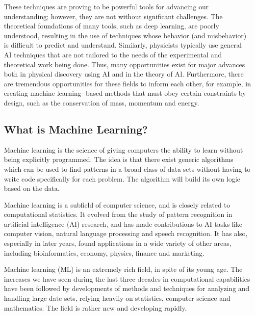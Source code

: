 \documentclass[%
oneside,                 %
final,                   %
10pt]{article}
\begin{document}
These techniques are proving to be powerful tools for advancing our
understanding; however, they are not without significant
challenges. The theoretical foundations of many tools, such as deep
learning, are poorly understood, resulting in the use of techniques
whose behavior (and misbehavior) is difficult to predict and
understand. Similarly, physicists typically use general AI techniques
that are not tailored to the needs of the experimental and theoretical
work being done. Thus, many opportunities exist for major advances
both in physical discovery using AI and in the theory of
AI. Furthermore, there are tremendous opportunities for these fields
to inform each other, for example, in creating machine learning- based
methods that must obey certain constraints by design, such as the
conservation of mass, momentum and energy.






\subsection{What is Machine Learning?}

Machine learning is the science of giving computers the ability to
learn without being explicitly programmed.  The idea is that there
exist generic algorithms which can be used to find patterns in a broad
class of data sets without having to write code specifically for each
problem. The algorithm will build its own logic based on the data.

Machine learning is a subfield of computer science, and is closely
related to computational statistics.  It evolved from the study of
pattern recognition in artificial intelligence (AI) research, and has
made contributions to AI tasks like computer vision, natural language
processing and speech recognition. It has also, especially in later
years, found applications in a wide variety of other areas, including
bioinformatics, economy, physics, finance and marketing.








Machine learning (ML) is an extremely rich field, in spite of its young age. The
increases we have seen during the last three decades in computational
capabilities have been followed by developments of methods and
techniques for analyzing and handling large date sets, relying heavily
on statistics, computer science and mathematics.  The field is rather
new and developing rapidly. 
\end{document}
